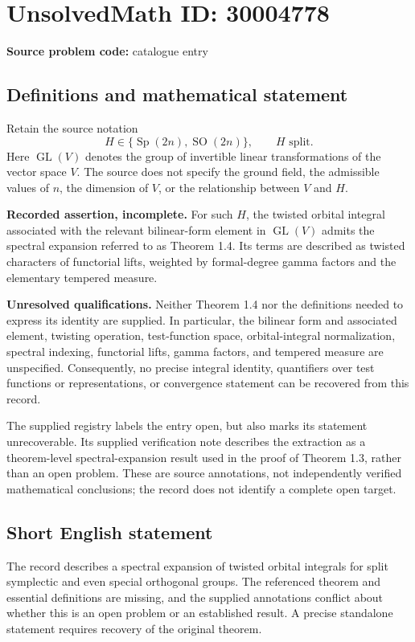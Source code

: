 \documentclass[11pt]{article}
\begin{document}
\section*{UnsolvedMath ID: 30004778}
\textbf{Source problem code:} catalogue entry
\subsection{Definitions and mathematical statement}
Retain the source notation
\[
H\in\{\operatorname{Sp}(2n),\operatorname{SO}(2n)\},\qquad H\text{ split}.
\]
Here \(\operatorname{GL}(V)\) denotes the group of invertible linear transformations of the vector space \(V\). The source does not specify the ground field, the admissible values of \(n\), the dimension of \(V\), or the relationship between \(V\) and \(H\).

\textbf{Recorded assertion, incomplete.} For such \(H\), the twisted orbital integral associated with the relevant bilinear-form element in \(\operatorname{GL}(V)\) admits the spectral expansion referred to as Theorem 1.4. Its terms are described as twisted characters of functorial lifts, weighted by formal-degree gamma factors and the elementary tempered measure.

\textbf{Unresolved qualifications.} Neither Theorem 1.4 nor the definitions needed to express its identity are supplied. In particular, the bilinear form and associated element, twisting operation, test-function space, orbital-integral normalization, spectral indexing, functorial lifts, gamma factors, and tempered measure are unspecified. Consequently, no precise integral identity, quantifiers over test functions or representations, or convergence statement can be recovered from this record.

The supplied registry labels the entry open, but also marks its statement unrecoverable. Its supplied verification note describes the extraction as a theorem-level spectral-expansion result used in the proof of Theorem 1.3, rather than an open problem. These are source annotations, not independently verified mathematical conclusions; the record does not identify a complete open target.
\subsection{Short English statement}
The record describes a spectral expansion of twisted orbital integrals for split symplectic and even special orthogonal groups. The referenced theorem and essential definitions are missing, and the supplied annotations conflict about whether this is an open problem or an established result. A precise standalone statement requires recovery of the original theorem.
\end{document}
